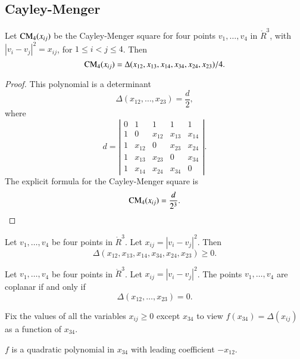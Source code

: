\subsection{Cayley-Menger}

\begin{lemma}
	Let ${\operatorname{CM}}_4(x_{ij})$ be the Cayley-Menger square for
four points $v_1,\ldots,v_4$ in $\ring{R}^3$, with $|v_i-v_j|^2 = x_{ij}$,
for $1\le i < j \le 4$.  Then%
	$${\operatorname{CM}}_4(x_{ij}) = \Delta(x_{12},x_{13},x_{14},x_{34},x_{24},x_{23})/4.$$
\end{lemma}

\begin{proof}
This polynomial is a determinant  $$\Delta(x_{12},\ldots,x_{23}) = \frac{d}{2},$$
where $$
     d=\left|\begin{matrix}
     0 & 1 & 1 & 1 & 1\\
     1 & 0 & x_{12} & x_{13} & x_{14} \\
     1 & x_{12} & 0 & x_{23} & x_{24} \\
     1 & x_{13} & x_{23} & 0 & x_{34} \\
     1 & x_{14} & x_{24} & x_{34} & 0
  \end{matrix}\right|.
  $$
The explicit formula for the Cayley-Menger
square is
	$$
	{\operatorname{CM}}_4(x_{ij}) = \frac{d}{2^3}.
	$$
\end{proof}


\begin{lemma}
Let $v_1,\ldots,v_4$ be four points
in $\ring{R}^3$.  Let $x_{ij} = |v_i-v_j|^2$.  Then
	$$\Delta(x_{12},x_{13},x_{14},x_{34},x_{24},x_{23})\ge0.$$
\end{lemma}

\begin{lemma}\label{tarski:delta0}
Let $v_1,\ldots,v_4$ be four points
in $\ring{R}^3$.  Let $x_{ij} = |v_i-v_j|^2$.
The points $v_1,\ldots,v_4$ are coplanar if and only if
	$$\Delta(x_{12},\ldots,x_{23}) = 0.$$
\end{lemma}

Fix the values of all the variables $x_{ij}\ge 0$ except
$x_{34}$ to view $f(x_{34})=\Delta(x_{ij})$ as a function of $x_{34}$.  %

\begin{lemma} 
$f$  is a quadratic
polynomial in $x_{34}$ with leading coefficient $-x_{12}$. 
\end{lemma}

